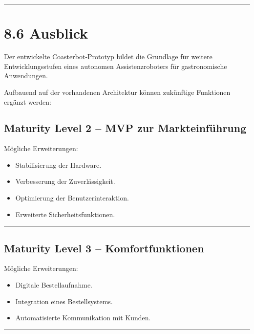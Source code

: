 \documentclass[
  a4paper,
  12pt,
  DIV=12,        %
  parskip=half,  %
  headings=small %
]{scrartcl}
\theoremstyle{definition}
\providecommand{\tightlist}{%
  \setlength{\itemsep}{0pt}\setlength{\parskip}{0pt}}
\theoremstyle{definition}
\providecommand{\tightlist}{%
  \setlength{\itemsep}{0pt}\setlength{\parskip}{0pt}}
\begin{document}
\begin{center}\rule{0.5\linewidth}{0.5pt}\end{center}

\section{8.6 Ausblick}\label{ausblick}

Der entwickelte Coasterbot-Prototyp bildet die Grundlage für weitere
Entwicklungsstufen eines autonomen Assistenzroboters für gastronomische
Anwendungen.

Aufbauend auf der vorhandenen Architektur können zukünftige Funktionen
ergänzt werden:

\subsection{Maturity Level 2 -- MVP zur
Markteinführung}\label{maturity-level-2-mvp-zur-markteinfuxfchrung}

Mögliche Erweiterungen:

\begin{itemize}
\tightlist
\item
  Stabilisierung der Hardware.
\item
  Verbesserung der Zuverlässigkeit.
\item
  Optimierung der Benutzerinteraktion.
\item
  Erweiterte Sicherheitsfunktionen.
\end{itemize}

\begin{center}\rule{0.5\linewidth}{0.5pt}\end{center}

\subsection{Maturity Level 3 --
Komfortfunktionen}\label{maturity-level-3-komfortfunktionen}

Mögliche Erweiterungen:

\begin{itemize}
\tightlist
\item
  Digitale Bestellaufnahme.
\item
  Integration eines Bestellsystems.
\item
  Automatisierte Kommunikation mit Kunden.
\end{itemize}

\begin{center}\rule{0.5\linewidth}{0.5pt}\end{center}
\end{document}
